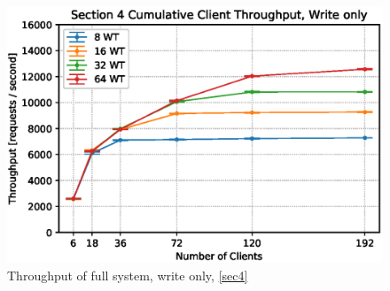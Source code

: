 \documentclass[11pt,a4paper]{article}
\begin{document}
\begin{figure}
    \centering
    \includegraphics[width=0.7\linewidth]{plots/4b_throughputMiddleware.eps}
    \caption{Throughput of full system, write only, \autoref{sec4}}
    \label{fig:4-throughput}
\end{figure}
\end{document}
